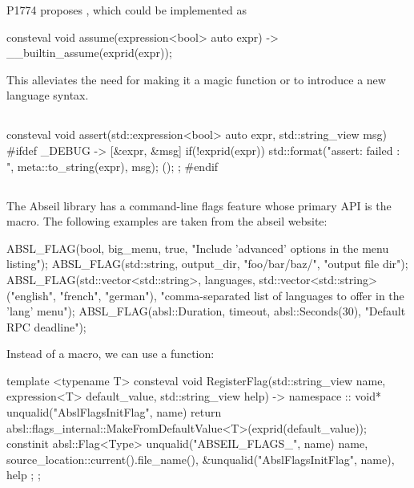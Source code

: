 \documentclass{wg21}
\begin{document}
P1774 \cite{P1774R0} proposes , which
could be implemented as 

\begin{codeblock}
consteval void assume(expression<bool> auto expr) {
    -> __builtin_assume(exprid(expr));
}
\end{codeblock}

This alleviates the need for making it a magic function or to introduce a new language syntax.

\subsection{}

\begin{codeblock}
consteval void assert(std::expression<bool> auto expr, std::string_view msg) {
#ifdef _DEBUG
    -> { [&expr, &msg]{ 
            if(!exprid(expr)) {
                std::format("assert: {} failed : {}", meta::to_string(expr), msg);
            }
        }();
    };
#endif    
}
\end{codeblock}


\subsection{}

The Abseil library has a command-line flags feature whose primary API is the  macro.
The following examples are taken from the abseil website:


\begin{codeblock}
ABSL_FLAG(bool, big_menu, true,
    "Include 'advanced' options in the menu listing");
ABSL_FLAG(std::string, output_dir, "foo/bar/baz/", "output file dir");
ABSL_FLAG(std::vector<std::string>, languages,
    std::vector<std::string>({"english", "french", "german"}),
    "comma-separated list of languages to offer in the 'lang' menu");
ABSL_FLAG(absl::Duration, timeout, absl::Seconds(30), "Default RPC deadline");
\end{codeblock}

Instead of a macro, we can use a  function:

\begin{codeblock}
template <typename T>
consteval void RegisterFlag(std::string_view name, 
                            expression<T> default_value,
                            std::string_view help) {
    -> namespace :: {
        void* unqualid("AbslFlagsInitFlag", name) {
            return absl::flags_internal::MakeFromDefaultValue<T>(exprid(default_value));
        }
        constinit absl::Flag<Type> unqualid("ABSEIL_FLAGS_", name) {
            name, 
            source_location::current().file_name(),
            &unqualid("AbslFlagsInitFlag", name),
            help
        };
    };
}
\end{codeblock}
\end{document}
